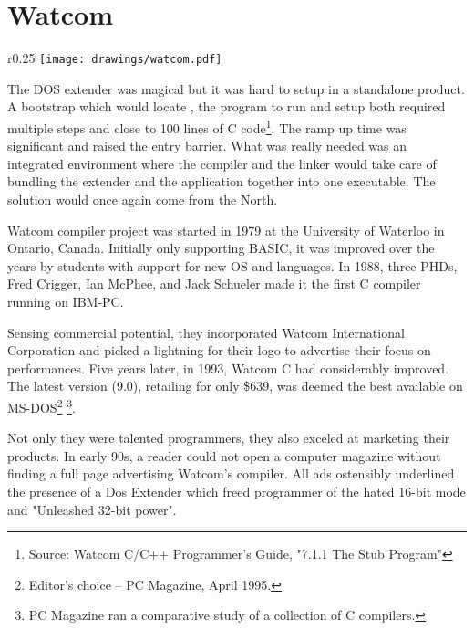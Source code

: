 \section{Watcom}

\begin{wrapfigure}[9]{r}{0.25\textwidth}
\centering
\texttt{[image: drawings/watcom.pdf]}
\end{wrapfigure}


The DOS extender was magical but it was hard to setup in a standalone product. A bootstrap which would locate , the program to run and setup both required multiple steps and close to 100 lines of C code\footnote{Source: Watcom C/C++ Programmer's Guide, "7.1.1 The Stub Program"}. The ramp up time was significant and raised the entry barrier. What was really needed was an integrated environment where the compiler and the linker would take care of bundling the extender and the application together into one executable. The solution would once again come from the North.\\ 
\par

Watcom compiler project was started in 1979 at the University of Waterloo in Ontario, Canada. Initially only supporting BASIC, it was improved over the years by students with support for new OS and languages. In 1988, three PHDs, Fred Crigger, Ian McPhee, and Jack Schueler made it the first C compiler running on IBM-PC.\\
\par
Sensing commercial potential, they incorporated Watcom International Corporation and picked a lightning for their logo to advertise their focus on performances. Five years later, in 1993, Watcom C had considerably improved. The latest version (9.0), retailing for only \$639,  was deemed the best available on MS-DOS\footnote{Editor's choice -- PC Magazine, April 1995.} \footnote{PC Magazine ran a comparative study of a collection of C compilers.}. \\
\par
Not only they were talented programmers, they also exceled at marketing their products. In early 90s, a reader could not open a computer magazine without finding a full page advertising Watcom's compiler. All ads ostensibly underlined the presence of a Dos Extender which freed programmer of the hated 16-bit mode and "Unleashed 32-bit power".
\par
\label{watcomad}



